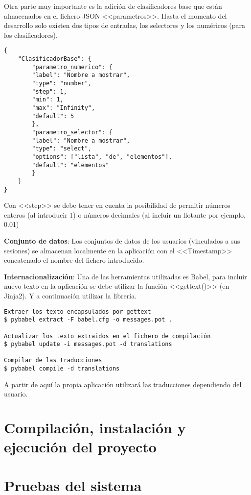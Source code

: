 Otra parte muy importante es la adición de clasificadores base que están
almacenados en el fichero JSON <<parametros>>. Hasta el momento del desarrollo
solo existen dos tipos de entradas, los selectores y los numéricos (para los
clasificadores).

\begin{tcolorbox}[colback=cyan!5!white,colframe=cyan!75!black,title=Estructura para añadir clasificadores y sus parámetros]
\begin{verbatim}
{
    "ClasificadorBase": {
        "parametro_numerico": {
        "label": "Nombre a mostrar",
        "type": "number",
        "step": 1,
        "min": 1,
        "max": "Infinity",
        "default": 5
        },
        "parametro_selector": {
        "label": "Nombre a mostrar",
        "type": "select",
        "options": ["lista", "de", "elementos"],
        "default": "elementos"
        }
    }
}
\end{verbatim}
\end{tcolorbox}

Con <<step>> se debe tener en cuenta la posibilidad de permitir números enteros
(al introducir 1) o números decimales (al incluir un flotante por ejemplo, 0.01)

\textbf{Conjunto de datos}: Los conjuntos de datos de los usuarios (vinculados a
sus sesiones) se almacenan localmente en la aplicación con el <<Timestamp>>
concatenado el nombre del fichero introducido.

\textbf{Internacionalización}: Una de las herramientas utilizadas es Babel,
para incluir nuevo texto en la aplicación se debe utilizar la función
<<gettext()>> (en Jinja2). Y a continuación utilizar la librería.

\begin{tcolorbox}[colback=cyan!5!white,colframe=cyan!75!black,title=Proceso de internacionalización (desde /web)]
\begin{verbatim}
Extraer los texto encapsulados por gettext
$ pybabel extract -F babel.cfg -o messages.pot . 

Actualizar los texto extraidos en el fichero de compilación
$ pybabel update -i messages.pot -d translations

Compilar de las traducciones
$ pybabel compile -d translations 
\end{verbatim}
\end{tcolorbox}
 
A partir de aquí la propia aplicación utilizará las traducciones dependiendo del
usuario.


\section{Compilación, instalación y ejecución del proyecto}

\section{Pruebas del sistema}
